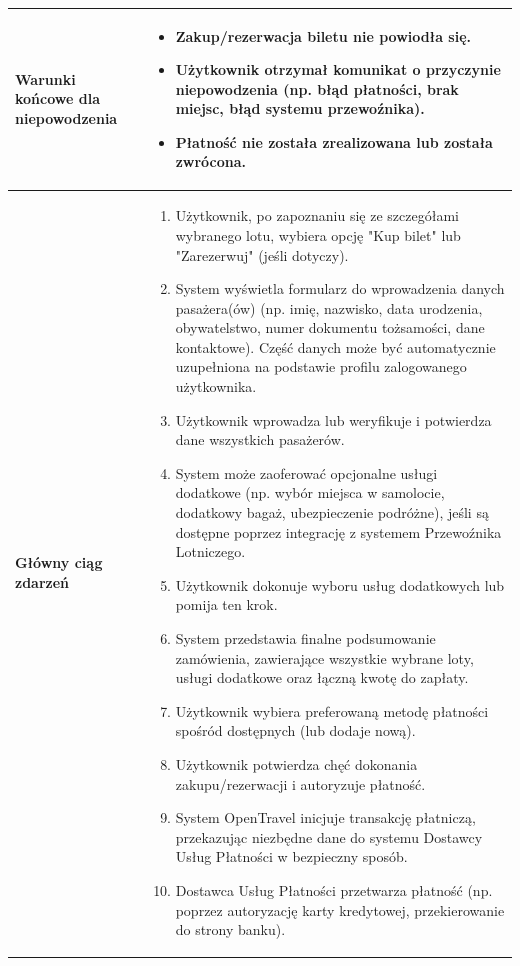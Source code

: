 \documentclass[a4paper,12pt]{article}
\begin{document}
\begin{longtable}{|p{\pierwszakolumnaszerokoscPUBLZakRes}|p{\drugakolumnaszerokoscPUBLZakRes}|}
    \hline
    \textbf{Warunki końcowe dla niepowodzenia} &
        \begin{itemize} \itemsep0pt \parskip0pt \parsep0pt
            \item Zakup/rezerwacja biletu nie powiodła się.
            \item Użytkownik otrzymał komunikat o przyczynie niepowodzenia (np. błąd płatności, brak miejsc, błąd systemu przewoźnika).
            \item Płatność nie została zrealizowana lub została zwrócona.
        \end{itemize} \\
    \hline
    \textbf{Główny ciąg zdarzeń} &
        \begin{enumerate} \itemsep0pt \parskip0pt \parsep0pt
            \item Użytkownik, po zapoznaniu się ze szczegółami wybranego lotu, wybiera opcję "Kup bilet" lub "Zarezerwuj" (jeśli dotyczy).
            \item System wyświetla formularz do wprowadzenia danych pasażera(ów) (np. imię, nazwisko, data urodzenia, obywatelstwo, numer dokumentu tożsamości, dane kontaktowe). Część danych może być automatycznie uzupełniona na podstawie profilu zalogowanego użytkownika.
            \item Użytkownik wprowadza lub weryfikuje i potwierdza dane wszystkich pasażerów.
            \item System może zaoferować opcjonalne usługi dodatkowe (np. wybór miejsca w samolocie, dodatkowy bagaż, ubezpieczenie podróżne), jeśli są dostępne poprzez integrację z systemem Przewoźnika Lotniczego.
            \item Użytkownik dokonuje wyboru usług dodatkowych lub pomija ten krok.
            \item System przedstawia finalne podsumowanie zamówienia, zawierające wszystkie wybrane loty, usługi dodatkowe oraz łączną kwotę do zapłaty.
            \item Użytkownik wybiera preferowaną metodę płatności spośród dostępnych (lub dodaje nową).
            \item Użytkownik potwierdza chęć dokonania zakupu/rezerwacji i autoryzuje płatność.
            \item System OpenTravel inicjuje transakcję płatniczą, przekazując niezbędne dane do systemu Dostawcy Usług Płatności w bezpieczny sposób.
            \item Dostawca Usług Płatności przetwarza płatność (np. poprzez autoryzację karty kredytowej, przekierowanie do strony banku).

\end{enumerate}
\end{longtable}
\end{document}
